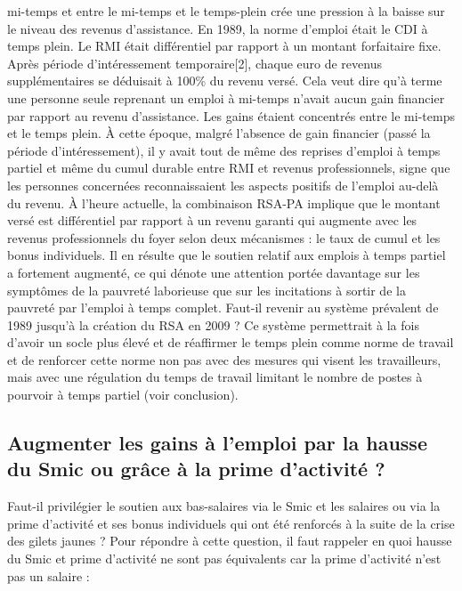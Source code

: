 \documentclass[
  french,
]{article}
\begin{document}
mi-temps et entre le mi-temps et le temps-plein crée une pression à la
baisse sur le niveau des revenus d'assistance. En 1989, la norme
d'emploi était le CDI à temps plein. Le RMI était différentiel par
rapport à un montant forfaitaire fixe. Après période d'intéressement
temporaire{[}2{]}, chaque euro de revenus supplémentaires se déduisait à
100\% du revenu versé. Cela veut dire qu'à terme une personne seule
reprenant un emploi à mi-temps n'avait aucun gain financier par rapport
au revenu d'assistance. Les gains étaient concentrés entre le mi-temps
et le temps plein. À cette époque, malgré l'absence de gain financier
(passé la période d'intéressement), il y avait tout de même des reprises
d'emploi à temps partiel et même du cumul durable entre RMI et revenus
professionnels, signe que les personnes concernées reconnaissaient les
aspects positifs de l'emploi au-delà du revenu. À l'heure actuelle, la
combinaison RSA-PA implique que le montant versé est différentiel par
rapport à un revenu garanti qui augmente avec les revenus professionnels
du foyer selon deux mécanismes : le taux de cumul et les bonus
individuels. Il en résulte que le soutien relatif aux emplois à temps
partiel a fortement augmenté, ce qui dénote une attention portée
davantage sur les symptômes de la pauvreté laborieuse que sur les
incitations à sortir de la pauvreté par l'emploi à temps complet.
Faut-il revenir au système prévalent de 1989 jusqu'à la création du RSA
en 2009 ? Ce système permettrait à la fois d'avoir un socle plus élevé
et de réaffirmer le temps plein comme norme de travail et de renforcer
cette norme non pas avec des mesures qui visent les travailleurs, mais
avec une régulation du temps de travail limitant le nombre de postes à
pourvoir à temps partiel (voir conclusion).

\subsection{Augmenter les gains à l'emploi par la hausse du Smic ou
grâce à la prime d'activité
?}\label{augmenter-les-gains-uxe0-lemploi-par-la-hausse-du-smic-ou-gruxe2ce-uxe0-la-prime-dactivituxe9}

Faut-il privilégier le soutien aux bas-salaires via le Smic et les
salaires ou via la prime d'activité et ses bonus individuels qui ont été
renforcés à la suite de la crise des gilets jaunes ? Pour répondre à
cette question, il faut rappeler en quoi hausse du Smic et prime
d'activité ne sont pas équivalents car la prime d'activité n'est pas un
salaire :
\end{document}
